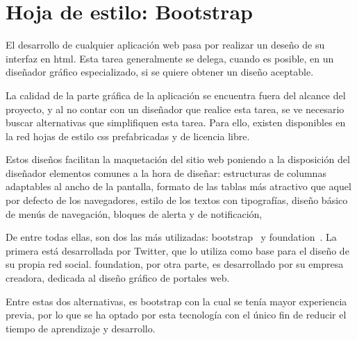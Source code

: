 \documentclass[main]{subfiles}
\begin{document}
\section{Hoja de estilo: Bootstrap}
\label{sec:tech-bootstrap}

El desarrollo de cualquier aplicación web pasa por realizar un deseño de su interfaz en \gls{html}. Esta tarea generalmente se delega, cuando es posible, en un diseñador gráfico especializado, si se quiere obtener un diseño aceptable.

La calidad de la parte gráfica de la aplicación se encuentra fuera del alcance del proyecto, y al no contar con un diseñador que realice esta tarea, se ve necesario buscar alternativas que simplifiquen esta tarea. Para ello, existen disponibles en la red hojas de estilo \gls{css} prefabricadas y de licencia libre.

Estos diseños facilitan la maquetación del sitio web poniendo a la disposición del diseñador elementos comunes a la hora de diseñar: estructuras de columnas adaptables al ancho de la pantalla, formato de las tablas más atractivo que aquel por defecto de los navegadores, estilo de los textos con tipografías, diseño básico de menús de navegación, bloques de alerta y de notificación, 

De entre todas ellas, son dos las más utilizadas: \gls{bootstrap}~\autocite{bootstrap} y \gls{foundation}~\autocite{foundation}. La primera está desarrollada por Twitter, que lo utiliza como base para el diseño de su propia red social. \Gls{foundation}, por otra parte, es desarrollado por su empresa creadora, dedicada al diseño gráfico de portales web.

Entre estas dos alternativas, es \gls{bootstrap} con la cual se tenía mayor experiencia previa, por lo que se ha optado por esta tecnología con el único fin de reducir el tiempo de aprendizaje y desarrollo.
\end{document}
